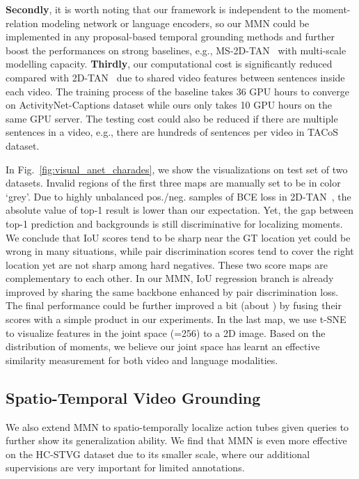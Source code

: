 \documentclass[letterpaper]{article} \usepackage{aaai22}  \usepackage{times}  \usepackage{helvet}  \usepackage{courier}  \usepackage[hyphens]{url}  \usepackage{graphicx} \urlstyle{rm} \def\UrlFont{\rm}  \usepackage{natbib}  \usepackage{caption} \DeclareCaptionStyle{ruled}{labelfont=normalfont,labelsep=colon,strut=off} \frenchspacing  \setlength{\pdfpagewidth}{8.5in}  \setlength{\pdfpageheight}{11in}  \usepackage{algorithm}
\begin{document}
{\bf Secondly}, it is worth noting that our framework is independent to the moment-relation modeling network or language encoders, so our MMN could be implemented in any proposal-based temporal grounding methods and further boost the performances on strong baselines, e.g., MS-2D-TAN~\cite{DBLP:journals/corr/abs-2012-02646} with multi-scale modelling capacity. 
{\bf Thirdly}, our computational cost is significantly reduced compared with 2D-TAN~\cite{DBLP:conf/aaai/ZhangPFL20} due to shared video features between sentences inside each video. The training process of the baseline takes 36 GPU hours to converge on ActivityNet-Captions dataset while ours only takes 10 GPU hours on the same GPU server. The testing cost could also be reduced if there are multiple sentences in a video, e.g., there are hundreds of sentences per video in TACoS dataset.

 In Fig.~\ref{fig:visual_anet_charades}, we show the visualizations on test set of two datasets. Invalid regions of the first three maps are manually set to be in color `grey'. Due to highly unbalanced pos./neg. samples of BCE loss in 2D-TAN~\cite{DBLP:conf/aaai/ZhangPFL20}, the absolute value of top-1 result is lower than our expectation. Yet, the gap between top-1 prediction and backgrounds is still discriminative for localizing moments. We conclude that IoU scores tend to be sharp near the GT location yet could be wrong in many situations, while pair discrimination scores tend to cover the right location yet are not sharp among hard negatives. These two score maps are complementary to each other. In our MMN, IoU regression branch is already improved by sharing the same backbone enhanced by pair discrimination loss. The final performance could be further improved a bit (about ) by fusing their scores with a simple product in our experiments. In the last map, we use t-SNE~\cite{JMLR:v9:vandermaaten08a} to visualize features in the joint space (=256) to a 2D image. Based on the distribution of moments, we believe our joint space has learnt an effective similarity measurement for both video and language modalities.

\subsection{Spatio-Temporal Video Grounding}
We also extend MMN to spatio-temporally localize action tubes given queries to further show its generalization ability. We find that MMN is even more effective on the HC-STVG dataset due to its smaller scale, where our additional supervisions are very important for limited annotations.
\end{document}

